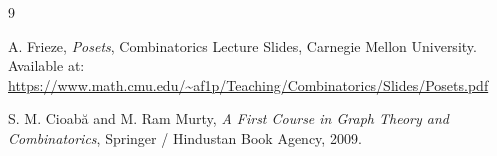 \documentclass{amsart}
\numberwithin{equation}{section}
\theoremstyle{plain}
\theoremstyle{definition}
\begin{document}
\begin{thebibliography}{9}

A. Frieze,
\textit{Posets},
Combinatorics Lecture Slides, Carnegie Mellon University.
Available at: \url{https://www.math.cmu.edu/~af1p/Teaching/Combinatorics/Slides/Posets.pdf}

S. M. Cioab\u{a} and M. Ram Murty,
\textit{A First Course in Graph Theory and Combinatorics},
Springer / Hindustan Book Agency, 2009.

\end{thebibliography}
\end{document}
